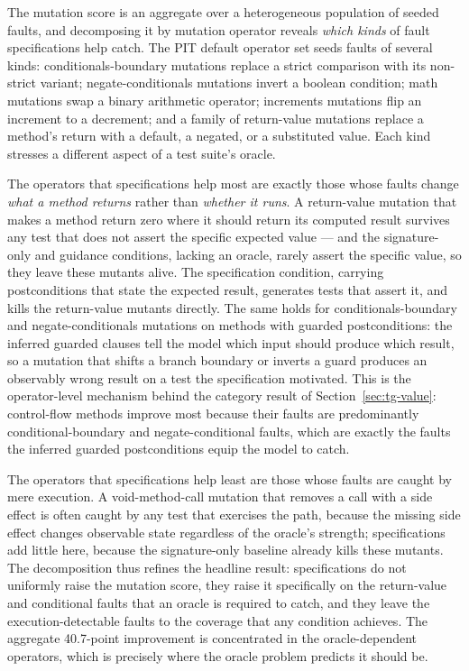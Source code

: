 The mutation score is an aggregate over a heterogeneous population of seeded
faults, and decomposing it by mutation operator reveals \emph{which kinds} of
fault specifications help catch. The PIT default operator set seeds faults of
several kinds: conditionals-boundary mutations replace a strict comparison with
its non-strict variant; negate-conditionals mutations invert a boolean
condition; math mutations swap a binary arithmetic operator; increments
mutations flip an increment to a decrement; and a family of return-value
mutations replace a method's return with a default, a negated, or a substituted
value. Each kind stresses a different aspect of a test suite's oracle.

The operators that specifications help most are exactly those whose faults change
\emph{what a method returns} rather than \emph{whether it runs}. A return-value
mutation that makes a method return zero where it should return its computed
result survives any test that does not assert the specific expected value --- and
the signature-only and guidance conditions, lacking an oracle, rarely assert the
specific value, so they leave these mutants alive. The specification condition,
carrying postconditions that state the expected result, generates tests that
assert it, and kills the return-value mutants directly. The same holds for
conditionals-boundary and negate-conditionals mutations on methods with guarded
postconditions: the inferred guarded clauses tell the model which input should
produce which result, so a mutation that shifts a branch boundary or inverts a
guard produces an observably wrong result on a test the specification motivated.
This is the operator-level mechanism behind the category result of
Section~\ref{sec:tg-value}: control-flow methods improve most because their
faults are predominantly conditional-boundary and negate-conditional faults,
which are exactly the faults the inferred guarded postconditions equip the model
to catch.

The operators that specifications help least are those whose faults are caught by
mere execution. A void-method-call mutation that removes a call with a
side effect is often caught by any test that exercises the path, because the
missing side effect changes observable state regardless of the oracle's strength;
specifications add little here, because the signature-only baseline already kills
these mutants. The decomposition thus refines the headline result: specifications
do not uniformly raise the mutation score, they raise it specifically on the
return-value and conditional faults that an oracle is required to catch, and they
leave the execution-detectable faults to the coverage that any condition
achieves. The aggregate 40.7-point improvement is concentrated in the
oracle-dependent operators, which is precisely where the oracle problem predicts
it should be.

